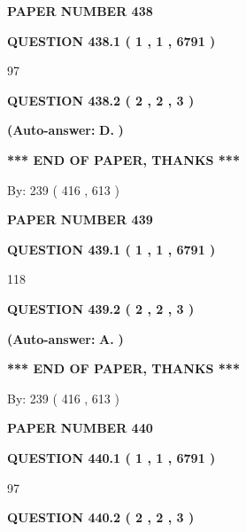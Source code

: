 \documentclass[12pt]{article}
\begin{document}
   
\newpage 
\setcounter{page}{ 
   438001 } 
   
   
 {\textbf{ \Large{ PAPER NUMBER  438  }}}
   
   
   
   
  
  
{\textbf{\large{QUESTION
438.1 
 ( 1 , 1 , 6791 )
}}}

97
  
  
{\textbf{\large{QUESTION
438.2 
 ( 2 , 2 , 3 )
}}}
 
 
{\textbf{(Auto-answer:}}
{\textbf{\large{
D.}}}
{\textbf{)}}
 
 
   
   
   
   
\vspace{1.0in} 
{\textbf{\large{ *** END OF PAPER, THANKS *** }}} 
   
   
\hspace{1.0in} By: 
 239 ( 416 ,  613 )
   
   
   
   
\newpage 
\setcounter{page}{ 
   439001 } 
   
   
 {\textbf{ \Large{ PAPER NUMBER  439  }}}
   
   
   
   
  
  
{\textbf{\large{QUESTION
439.1 
 ( 1 , 1 , 6791 )
}}}

118
  
  
{\textbf{\large{QUESTION
439.2 
 ( 2 , 2 , 3 )
}}}
 
 
{\textbf{(Auto-answer:}}
{\textbf{\large{
A.}}}
{\textbf{)}}
 
 
   
   
   
   
\vspace{1.0in} 
{\textbf{\large{ *** END OF PAPER, THANKS *** }}} 
   
   
\hspace{1.0in} By: 
 239 ( 416 ,  613 )
   
   
   
   
\newpage 
\setcounter{page}{ 
   440001 } 
   
   
 {\textbf{ \Large{ PAPER NUMBER  440  }}}
   
   
   
   
  
  
{\textbf{\large{QUESTION
440.1 
 ( 1 , 1 , 6791 )
}}}

97
  
  
{\textbf{\large{QUESTION
440.2 
 ( 2 , 2 , 3 )
}}}
 
\end{document}
